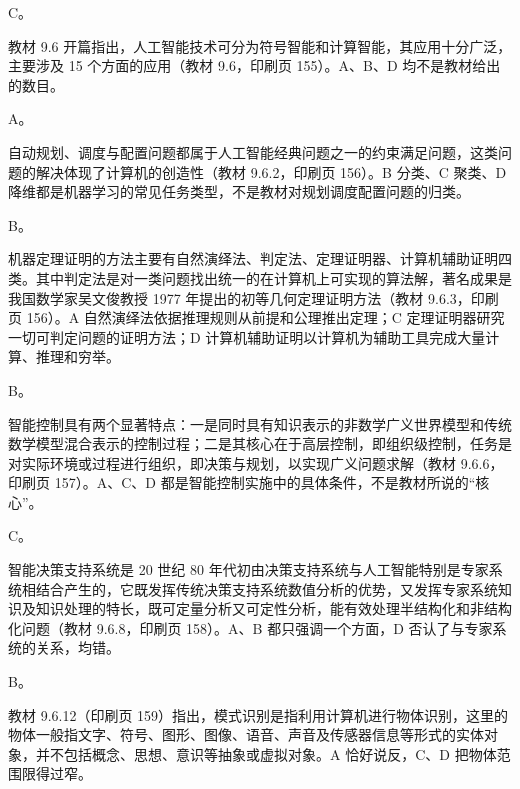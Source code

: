 \documentclass[a4paper,11pt]{article}
\begin{document}


\q C。\begin{analysis}教材 9.6 开篇指出，人工智能技术可分为符号智能和计算智能，其应用十分广泛，主要涉及 15 个方面的应用（教材 9.6，印刷页 155）。A、B、D 均不是教材给出的数目。\end{analysis}

\q A。\begin{analysis}自动规划、调度与配置问题都属于人工智能经典问题之一的约束满足问题，这类问题的解决体现了计算机的创造性（教材 9.6.2，印刷页 156）。B 分类、C 聚类、D 降维都是机器学习的常见任务类型，不是教材对规划调度配置问题的归类。\end{analysis}

\q B。\begin{analysis}机器定理证明的方法主要有自然演绎法、判定法、定理证明器、计算机辅助证明四类。其中判定法是对一类问题找出统一的在计算机上可实现的算法解，著名成果是我国数学家吴文俊教授 1977 年提出的初等几何定理证明方法（教材 9.6.3，印刷页 156）。A 自然演绎法依据推理规则从前提和公理推出定理；C 定理证明器研究一切可判定问题的证明方法；D 计算机辅助证明以计算机为辅助工具完成大量计算、推理和穷举。\end{analysis}

\q B。\begin{analysis}智能控制具有两个显著特点：一是同时具有知识表示的非数学广义世界模型和传统数学模型混合表示的控制过程；二是其核心在于高层控制，即组织级控制，任务是对实际环境或过程进行组织，即决策与规划，以实现广义问题求解（教材 9.6.6，印刷页 157）。A、C、D 都是智能控制实施中的具体条件，不是教材所说的“核心”。\end{analysis}

\q C。\begin{analysis}智能决策支持系统是 20 世纪 80 年代初由决策支持系统与人工智能特别是专家系统相结合产生的，它既发挥传统决策支持系统数值分析的优势，又发挥专家系统知识及知识处理的特长，既可定量分析又可定性分析，能有效处理半结构化和非结构化问题（教材 9.6.8，印刷页 158）。A、B 都只强调一个方面，D 否认了与专家系统的关系，均错。\end{analysis}

\q B。\begin{analysis}教材 9.6.12（印刷页 159）指出，模式识别是指利用计算机进行物体识别，这里的物体一般指文字、符号、图形、图像、语音、声音及传感器信息等形式的实体对象，并不包括概念、思想、意识等抽象或虚拟对象。A 恰好说反，C、D 把物体范围限得过窄。\end{analysis}
\end{document}
